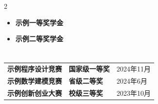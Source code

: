 \documentclass{customResume}
\begin{document}
\section{}
\begin{multicols}{2}
    \begin{itemize}
        \item \textbf{示例一等奖学金}
        \item \textbf{示例二等奖学金}
    \end{itemize}
\end{multicols}

\section{}
\begin{table}[!ht]
    \begin{tabularx}{\textwidth}{
        >{\bfseries}X
        >{\bfseries}X
        p{}
        }
        示例程序设计竞赛   & 国家级一等奖 & 2024年11月 \\
        示例数学建模竞赛   & 省级二等奖  & 2024年6月  \\
        示例创新创业大赛   & 校级三等奖  & 2023年10月 \\
    \end{tabularx}
\end{table}

\section{}
\end{document}
